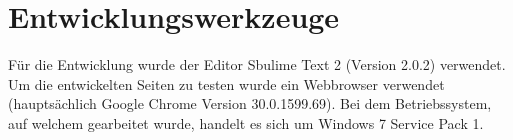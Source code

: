 \section{Entwicklungswerkzeuge}
Für die Entwicklung wurde der Editor Sbulime Text 2 (Version 2.0.2) verwendet. Um die entwickelten Seiten zu testen wurde ein Webbrowser verwendet (hauptsächlich Google Chrome Version 30.0.1599.69). Bei dem Betriebssystem, auf welchem gearbeitet wurde, handelt es sich um Windows 7 Service Pack 1.